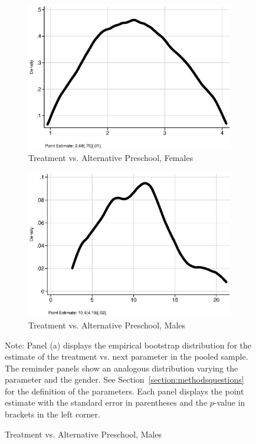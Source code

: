 \begin{figure}
\begin{subfigure}[h]{0.25\textwidth}
\end{subfigure}%
\begin{subfigure}[h]{0.25\textwidth}
	\centering
	\caption{Treatment vs. Alternative Preschool, Females}
		\includegraphics[width=\textwidth]{output/ratios_8_sexf.eps}
\end{subfigure}%
\begin{subfigure}[h]{0.25\textwidth}
	\centering
	\caption{Treatment vs. Alternative Preschool, Males}
		\includegraphics[width=\textwidth]{output/ratios_8_sexm.eps}
\end{subfigure}
\footnotesize \justify
Note: Panel (a) displays the empirical bootstrap distribution for the estimate of the treatment vs. next parameter in the pooled sample. The reminder panels show an analogous distribution varying the parameter and the gender. See Section~\ref{section:methodsquestions} for the definition of the parameters. Each panel displays the point estimate with the standard error in parentheses and the $p$-value in brackets in the left corner.
\end{figure}
\restoregeometry
\doublespacing



